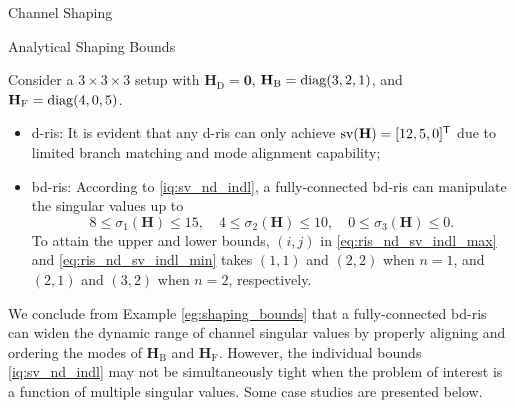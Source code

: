 \documentclass[journal]{IEEEtran}
\begin{document}
\begin{section}{Channel Shaping}
\begin{subsection}{Analytical Shaping Bounds}
		\begin{example}
			\label{eg:shaping_bounds}
			Consider a $3 \times 3 \times 3$ setup with $\mathbf{H}_\mathrm{D} = \mathbf{0}$, $\mathbf{H}_\mathrm{B} = \operatorname{diag}(3, 2, 1)$, and $\mathbf{H}_\mathrm{F} = \operatorname{diag}(4, 0, 5)$.
			\begin{itemize}
				\item \gls{d}-\gls{ris}: It is evident that any \gls{d}-\gls{ris} can only achieve $\operatorname{sv}(\mathbf{H}) = [12, 5, 0]^\mathsf{T}$ due to limited branch matching and mode alignment capability;
				\item \gls{bd}-\gls{ris}: According to \eqref{iq:sv_nd_indl}, a fully-connected \gls{bd}-\gls{ris} can manipulate the singular values up to
					\begin{equation*}
						8 \le \sigma_1(\mathbf{H}) \le 15, \quad 4 \le \sigma_2(\mathbf{H}) \le 10, \quad 0 \le \sigma_3(\mathbf{H}) \le 0.
					\end{equation*}
					To attain the upper and lower bounds, $(i,j)$ in \eqref{eq:ris_nd_sv_indl_max} and \eqref{eq:ris_nd_sv_indl_min} takes $(1, 1)$ and $(2, 2)$ when $n=1$, and $(2, 1)$ and $(3, 2)$ when $n=2$, respectively.
			\end{itemize}
		\end{example}

		We conclude from Example \ref{eg:shaping_bounds} that a fully-connected \gls{bd}-\gls{ris} can widen the dynamic range of channel singular values by properly aligning and ordering the modes of $\mathbf{H}_\mathrm{B}$ and $\mathbf{H}_\mathrm{F}$.
		However, the individual bounds \eqref{iq:sv_nd_indl} may not be simultaneously tight when the problem of interest is a function of multiple singular values.
		Some case studies are presented below.


\end{subsection}
\end{section}
\end{document}
